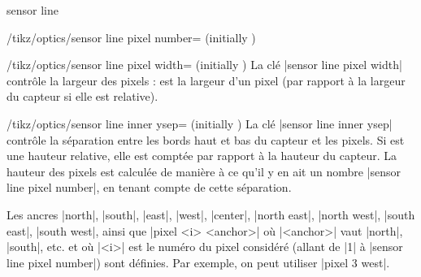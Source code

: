 \documentclass[a4paper]{ltxdoc}
\begin{document}
\begin{shape}{sensor line}
\begin{key}{/tikz/optics/sensor line pixel number= (initially )}
    \begin{codeexample}[]
    \end{codeexample}
\end{key}


\begin{key}{/tikz/optics/sensor line pixel width= (initially )}
    La clé |sensor line pixel width| contrôle la largeur des pixels :  est la largeur d'un pixel (par rapport à la largeur du capteur si elle est relative).

    \begin{codeexample}[]
    \end{codeexample}
\end{key}


\begin{key}{/tikz/optics/sensor line inner ysep= (initially )}
    La clé |sensor line inner ysep| contrôle la séparation entre les bords haut et bas du capteur et les pixels. Si  est une hauteur relative, elle est comptée par rapport à la hauteur du capteur. La hauteur des pixels est calculée de manière à ce qu'il y en ait un nombre |sensor line pixel number|, en tenant compte de cette séparation.

    \begin{codeexample}[]
    \end{codeexample}
\end{key}


Les ancres |north|, |south|, |east|, |west|, |center|, |north east|, |north west|, |south east|, |south west|, ainsi que
|pixel <i> <anchor>| où |<anchor>| vaut |north|, |south|, etc. et où |<i>| est le numéro du pixel considéré
(allant de |1| à |sensor line pixel number|) sont définies. Par exemple, on peut utiliser |pixel 3 west|.


\end{shape}
\end{document}
